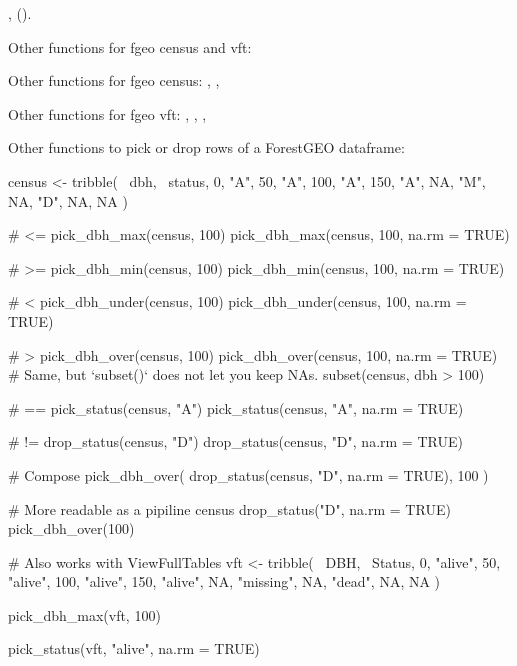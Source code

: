 \documentclass[a4paper]{book}
\begin{document}
%
\begin{SeeAlso}\relax
{},  (\code{[}).

Other functions for fgeo census and vft: 

Other functions for fgeo census: ,
, 

Other functions for fgeo vft: ,
, ,

Other functions to pick or drop rows of a ForestGEO dataframe: 
\end{SeeAlso}
%
\begin{Examples}
\begin{ExampleCode}
census <- tribble(
  ~dbh, ~status,
     0,     "A",
    50,     "A",
   100,     "A",
   150,     "A",
    NA,     "M",
    NA,     "D",
    NA,      NA
  )

# <=
pick_dbh_max(census, 100)
pick_dbh_max(census, 100, na.rm = TRUE)

# >=
pick_dbh_min(census, 100)
pick_dbh_min(census, 100, na.rm = TRUE)

# <
pick_dbh_under(census, 100)
pick_dbh_under(census, 100, na.rm = TRUE)

# >
pick_dbh_over(census, 100)
pick_dbh_over(census, 100, na.rm = TRUE)
# Same, but `subset()` does not let you keep NAs.
subset(census, dbh > 100)

# ==
pick_status(census, "A")
pick_status(census, "A", na.rm = TRUE)

# !=
drop_status(census, "D")
drop_status(census, "D", na.rm = TRUE)

# Compose
pick_dbh_over(
  drop_status(census, "D", na.rm = TRUE), 
  100
)

# More readable as a pipiline
census %
  drop_status("D", na.rm = TRUE) %
  pick_dbh_over(100)
 
# Also works with ViewFullTables
vft <- tribble(
  ~DBH,   ~Status,
     0,   "alive",
    50,   "alive",
   100,   "alive",
   150,   "alive",
    NA, "missing",
    NA,    "dead",
    NA,        NA
)

pick_dbh_max(vft, 100)

pick_status(vft, "alive",  na.rm = TRUE)

\end{ExampleCode}
\end{Examples}
\end{document}
